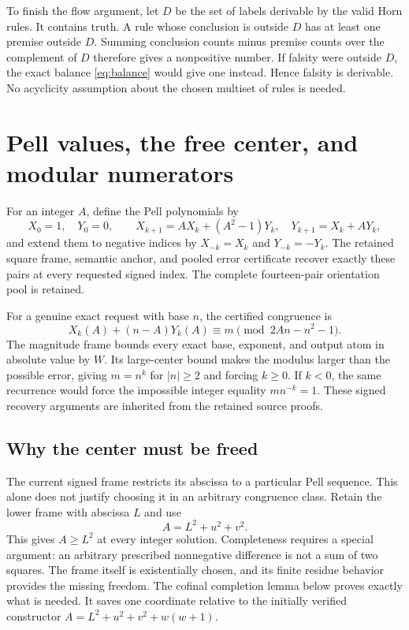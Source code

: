 \documentclass[11pt]{article}
\theoremstyle{remark}\newtheorem{remark}[theorem]{Remark}
\newcommand{\abs}[1]{\lvert #1\rvert}
\begin{document}
To finish the flow argument, let $D$ be the set of labels derivable by
the valid Horn rules. It contains truth. A rule whose conclusion is
outside $D$ has at least one premise outside $D$. Summing conclusion
counts minus premise counts over the complement of $D$ therefore gives
a nonpositive number. If falsity were outside $D$, the exact balance
\eqref{eq:balance} would give one instead. Hence falsity is derivable.
No acyclicity assumption about the chosen multiset of rules is needed.

\section{Pell values, the free center, and modular numerators}

For an integer $A$, define the Pell polynomials by
\[
 X_0=1,\quad Y_0=0,\qquad
 X_{k+1}=AX_k+(A^2-1)Y_k,\quad Y_{k+1}=X_k+AY_k,
\]
and extend them to negative indices by $X_{-k}=X_k$ and $Y_{-k}=-Y_k$.
The retained square frame, semantic anchor, and pooled error certificate
recover exactly these pairs at every requested signed index. The
complete fourteen-pair orientation pool is retained.

For a genuine exact request with base $n$, the certified congruence is
\[
 X_k(A)+(n-A)Y_k(A)\equiv m
 \pmod{2An-n^2-1}.
\]
The magnitude frame bounds every exact base, exponent, and output atom
in absolute value by $W$. Its large-center bound makes the modulus
larger than the possible error, giving $m=n^k$ for $\abs n\ge2$ and
forcing $k\ge0$. If $k<0$, the same recurrence would force the
impossible integer equality $m n^{-k}=1$. These signed recovery
arguments are inherited from the retained source proofs.

\subsection{Why the center must be freed}

The current signed frame restricts its abscissa to a particular Pell
sequence. This alone does not justify choosing it in an arbitrary
congruence class. Retain the lower frame with abscissa $L$ and use
\begin{equation}\label{eq:free-center}
                         A=L^2+u^2+v^2.
\end{equation}
This gives $A\ge L^2$ at every integer solution. Completeness requires
a special argument: an arbitrary prescribed nonnegative difference is
not a sum of two squares. The frame itself is existentially chosen,
and its finite residue behavior provides the missing freedom. The
cofinal completion lemma below proves exactly what is needed. It saves
one coordinate relative to the initially verified constructor
$A=L^2+u^2+v^2+w(w+1)$.
\end{document}
